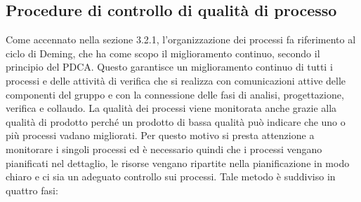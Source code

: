 \subsection{Procedure di controllo di qualità di processo}

Come accennato nella sezione 3.2.1, l'organizzazione dei processi fa riferimento al ciclo di Deming, che ha come scopo il miglioramento continuo, secondo il principio del PDCA. Questo garantisce un miglioramento continuo di tutti i processi e delle attività di verifica che si realizza con comunicazioni attive delle componenti del gruppo e con la connessione delle fasi di analisi, progettazione, verifica e collaudo. La qualità dei processi viene monitorata anche grazie alla qualità di prodotto perché un prodotto di bassa qualità può indicare che uno o più processi vadano migliorati. Per questo motivo si presta attenzione a monitorare i singoli processi ed è necessario quindi che i processi vengano pianificati nel dettaglio, le risorse vengano ripartite nella pianificazione in modo chiaro e ci sia un adeguato controllo sui processi. Tale metodo è suddiviso in quattro fasi:

